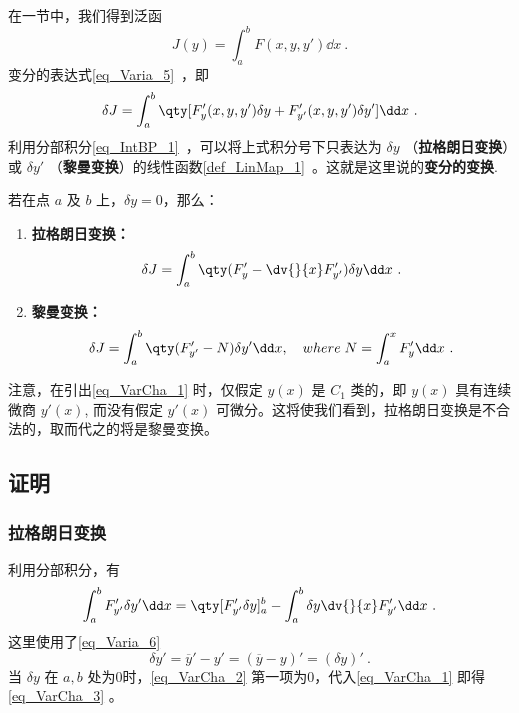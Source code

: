 
在一节中，我们得到泛函 
\begin{equation}
J(y)=\int_a^bF(x,y,y')\dd x~.
\end{equation}
变分的表达式\autoref{eq_Varia_5}~，即
\begin{equation}\label{eq_VarCha_1}
\delta J=\int_a^b\qty[F'_y(x,y,y')\delta y+F'_{y'}(x,y,y')\delta y']\dd x~.
\end{equation}
利用分部积分\autoref{eq_IntBP_1}~，可以将上式积分号下只表达为 $\delta y$ （\textbf{拉格朗日变换}）或 $\delta y'$ （\textbf{黎曼变换}）的线性函数\autoref{def_LinMap_1}~。这就是这里说的\textbf{变分的变换}.

若在点 $a$ 及 $b$ 上，$\delta y=0$，那么：
\begin{enumerate}
\item \textbf{拉格朗日变换：}
\begin{equation}\label{eq_VarCha_3}
\delta J=\int_a^b\qty(F'_y-\dv{}{x}F'_{y'})\delta y\dd x~.
\end{equation}
\item \textbf{黎曼变换：}
\begin{equation}\label{eq_VarCha_4}
\delta J=\int_a^b\qty(F'_{y'}-N)\delta y'\dd x ,\quad where \;N=\int_a^xF'_y\dd x~.
\end{equation}
\end{enumerate}


注意，在引出\autoref{eq_VarCha_1} 时，仅假定 $y(x)$ 是 $C_1$ 类的，即 $y(x)$ 具有连续微商 $y'(x)$, 而没有假定 $y'(x)$ 可微分。这将使我们看到，拉格朗日变换是不合法的，取而代之的将是黎曼变换。 

\subsection{证明}
\subsubsection{拉格朗日变换}
利用分部积分，有
\begin{equation}\label{eq_VarCha_2}
\int_a^bF'_{y'}\delta y'\dd x=\qty[F'_{y'}\delta y]_a^b-\int_a^b\delta y\dv{}{x}F'_{y'}\dd x~.
\end{equation}
这里使用了\autoref{eq_Varia_6}~
\begin{equation}\label{eq_VarCha_5}
\delta y'=\overline{y}'-y'=(\overline{y}-y)'=(\delta y)'~.
\end{equation}
当 $\delta y$ 在 $a,b$ 处为0时，\autoref{eq_VarCha_2} 第一项为0，代入\autoref{eq_VarCha_1} 即得\autoref{eq_VarCha_3} 。

